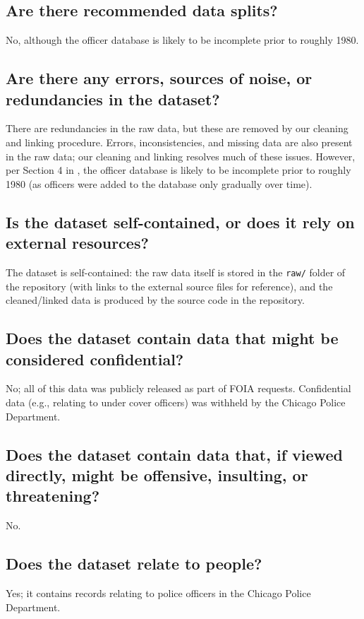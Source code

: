 \documentclass[letterpaper, 10 pt, conference]{ieeeconf}  %
\begin{document}
\subsection{Are there recommended data splits?}
No, although the officer database is likely to be incomplete prior to roughly 1980.

\subsection{Are there any errors, sources of noise, or redundancies in the dataset?}
There are redundancies in the raw data, but these are removed by our cleaning and linking procedure.
Errors, inconsistencies, and missing data are also present in the raw data; our cleaning and linking
resolves much of these issues. However, per Section 4 in \cite{horel2021the}, the officer database is
likely to be incomplete prior to roughly 1980 (as officers were added to the database only gradually over time).

\subsection{Is the dataset self-contained, or does it rely on external resources?}
The dataset is self-contained: the raw data itself is stored in the \texttt{raw/} folder of the repository 
(with links to the external source files for reference), 
and the cleaned/linked data is produced by the source code in the repository.

\subsection{Does the dataset contain data that might be considered confidential?}
No; all of this data was publicly released as part of FOIA requests. 
Confidential data (e.g., relating to under cover officers) was withheld 
by the Chicago Police Department.

\subsection{Does the dataset contain data that, if viewed directly, might be offensive, insulting, or threatening?}
No.

\subsection{Does the dataset relate to people?} 
Yes; it contains records relating to police officers in the Chicago Police Department.
\end{document}
